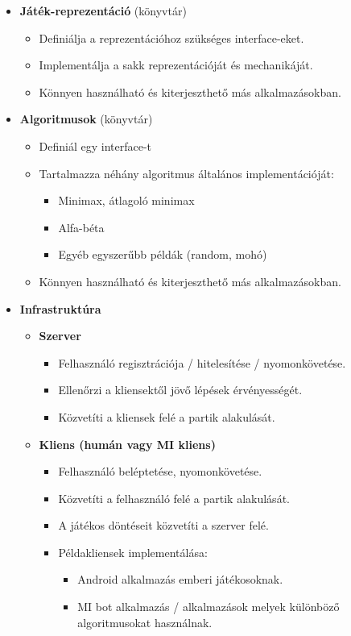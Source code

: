 \documentclass[twoside, a4paper, 12pt]{article}
\begin{document}
\begin{itemize}
	
	\item \textbf{Játék-reprezentáció} (könyvtár)
	\begin{itemize}
		\item Definiálja a reprezentációhoz szükséges interface-eket.
		\item Implementálja a sakk reprezentációját és mechanikáját.
		\item Könnyen használható és kiterjeszthető más alkalmazásokban.
	\end{itemize}

	\item \textbf{Algoritmusok} (könyvtár)
	\begin{itemize}
		\item Definiál egy interface-t
		\item Tartalmazza néhány algoritmus általános implementációját:
		\begin{itemize}
			\item Minimax, átlagoló minimax
			\item Alfa-béta
			\item Egyéb egyszerűbb példák (random, mohó)
		\end{itemize}
		\item Könnyen használható és kiterjeszthető más alkalmazásokban.
	\end{itemize}

	\item \textbf{Infrastruktúra}
	\begin{itemize}
		\item \textbf{Szerver}
		\begin{itemize}
			\item Felhasználó regisztrációja / hitelesítése / nyomonkövetése.
			\item Ellenőrzi a kliensektől jövő lépések érvényességét.
			\item Közvetíti a kliensek felé a partik alakulását.
		\end{itemize}
	
		\item \textbf{Kliens (humán vagy MI kliens)}
		\begin{itemize}
			\item Felhasználó beléptetése, nyomonkövetése.
			\item Közvetíti a felhasználó felé a partik alakulását.
			\item A játékos döntéseit közvetíti a szerver felé.
			\item Példakliensek implementálása:
			\begin{itemize}
				\item Android alkalmazás emberi játékosoknak.
				\item MI bot alkalmazás / alkalmazások melyek különböző algoritmusokat használnak.
			\end{itemize}
		\end{itemize}
	\end{itemize}
\end{itemize}
\end{document}
